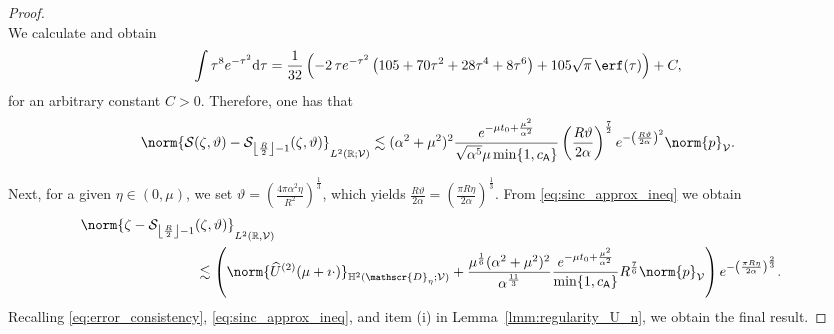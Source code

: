 \begin{proof}
\begin{equation}
\end{equation}
We calculate and obtain
\begin{equation}\label{eq:integra_x_to_8}
    \int
	\tau^{8}
	e^{
		-\tau^2
	}
    \text{d}\tau
    =
	\frac{1}{32}\left(
  -2\,\tau	e^{
		-\tau^2
	}
  \left(105 + 70 \tau^2 + 28 \tau^4 + 8 \tau^6\right)
  + 105 \sqrt{\pi}\,\erf(\tau)
  \right)
  +C,
\end{equation}
for an arbitrary constant $C>0$.
Therefore, one has that
\begin{equation}
\begin{aligned}
    \norm{
        \mathcal{S}(\zeta,\vartheta)
        -
        \mathcal{S}_{\left\lfloor \frac{R}{2} \right\rfloor-1}(\zeta,\vartheta)
    }_{L^2(\mathbb{R};\mathcal{V})}
    \lesssim
    (\alpha^2+\mu^2)^2
    \frac{
        e^{-\mu t_0 + \frac{\mu^2}{\alpha^2}}
        }{
        \sqrt{\alpha^5} \mu
        \min\{1, c_{\mathsf{A}}\}
    }
    \left(\frac{R\vartheta}{2\alpha}\right)^\frac{7}{2}
    e^{
    -\left(\frac{R\vartheta}{2\alpha}\right)^2}
    \norm{p}_{\mathcal{V}}.
\end{aligned}
\end{equation}

Next, for a given $\eta \in (0,\mu)$, we set $\vartheta = \left( \frac{4\pi \alpha^2 \eta}{R^2} \right)^{\frac{1}{3}}$,
which yields $\frac{R\vartheta}{2\alpha} = \left(\frac{\pi R \eta}{2\alpha} \right)^{\frac{1}{3}}$.
From \eqref{eq:sinc_approx_ineq} we obtain 
\begin{equation}
\begin{aligned}
    \norm{
        \zeta
        -
        \mathcal{S}_{\left\lfloor \frac{R}{2} \right\rfloor-1}(\zeta,\vartheta)
    }_{L^2(\mathbb{R},\mathcal{V})}
    \\
    &
    \hspace{-2cm}
    \lesssim
    \left(
        \norm{
            \widehat{U}^{(2)}(\mu+\imath\cdot)
        }_{\mathbb{H}^2(\mathscr{D}_\eta;\mathcal{V})}
    +
   \frac{
   	   \mu^{\frac{1}{6}}
   		(\alpha^2+\mu^2)^2 
   }{
   	\alpha^{\frac{11}{3}}
   }
    \frac{
        e^{-\mu t_0 + \frac{\mu^2}{\alpha^2}}
        }{
        \min\{1, c_{\mathsf{A}}\}
    }
    R^\frac{7}{6}
    \norm{p}_{\mathcal{V}}
    \right)
	e^{
		-\left(\frac{\pi R \eta}{2\alpha} \right)^{\frac{2}{3}}
	}.
\end{aligned}
\end{equation}
Recalling \eqref{eq:error_consistency}, \eqref{eq:sinc_approx_ineq}, and 
item (i) in Lemma~\ref{lmm:regularity_U_n}, we obtain the final result. 
\end{proof}

